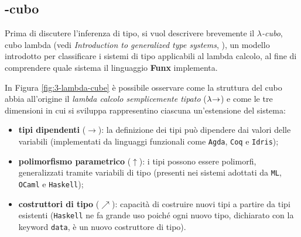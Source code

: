 \subsection{\texorpdfstring{\textlambda}{lambda}-cubo}
\label{sec:3-lambda-cube}

Prima di discutere l'inferenza di tipo, si vuol descrivere brevemente il \textit{$\lambda$-cubo},
cubo lambda (vedi \textit{Introduction to generalized type systems}, \cite{IntroductionGeneralizedTypeSystems}),
un modello introdotto per classificare i sistemi di tipo applicabili al lambda calcolo,
al fine di comprendere quale sistema il linguaggio \textbf{Funx} implementa.

\noindent In Figura \ref{fig:3-lambda-cube} è possibile osservare come la struttura del cubo abbia all'origine
il \textit{lambda calcolo semplicemente tipato} ($\lambda\mkern-4mu\rightarrow$) e come le tre dimensioni
in cui si sviluppa rappresentino ciascuna un'estensione del sistema:
\begin{itemize}
    \item \textbf{tipi dipendenti} ($\rightarrow$): la definizione dei tipi può dipendere dai valori delle variabili
          (implementati da linguaggi funzionali come \texttt{Agda}, \texttt{Coq} e \texttt{Idris});
    \item \textbf{polimorfismo parametrico} ($\uparrow$): i tipi possono essere polimorfi, generalizzati
          tramite variabili di tipo (presenti nei sistemi adottati da \texttt{ML}, \texttt{OCaml} e \texttt{Haskell});
    \item \textbf{costruttori di tipo} ($\nearrow$): capacità di costruire nuovi tipi a partire da tipi esistenti
          (\texttt{Haskell} ne fa grande uso poiché ogni nuovo tipo,
          dichiarato con la keyword \texttt{data}, è un nuovo costruttore di tipo).
\end{itemize}

